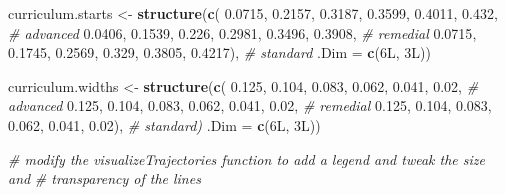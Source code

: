 \documentclass[english,floatsintext,jou]{apa6}
\newenvironment{Shaded}{\begin{snugshade}}{\end{snugshade}}
\newcommand{\KeywordTok}[1]{\textcolor[rgb]{0.13,0.29,0.53}{\textbf{{#1}}}}
\newcommand{\DataTypeTok}[1]{\textcolor[rgb]{0.13,0.29,0.53}{{#1}}}
\newcommand{\FloatTok}[1]{\textcolor[rgb]{0.00,0.00,0.81}{{#1}}}
\newcommand{\StringTok}[1]{\textcolor[rgb]{0.31,0.60,0.02}{{#1}}}
\newcommand{\CommentTok}[1]{\textcolor[rgb]{0.56,0.35,0.01}{\textit{{#1}}}}
\newcommand{\NormalTok}[1]{{#1}}
\theoremstyle{definition}
\theoremstyle{definition}
\theoremstyle{definition}
\theoremstyle{remark}
\begin{document}
\begin{appendix}
\begin{Shaded}
\begin{Highlighting}[]
\NormalTok{curriculum.starts <-}\StringTok{ }\KeywordTok{structure}\NormalTok{(}\KeywordTok{c}\NormalTok{(}
\FloatTok{0.0715}\NormalTok{, }\FloatTok{0.2157}\NormalTok{, }\FloatTok{0.3187}\NormalTok{, }\FloatTok{0.3599}\NormalTok{, }\FloatTok{0.4011}\NormalTok{, }\FloatTok{0.432}\NormalTok{, }\CommentTok{# advanced}
\FloatTok{0.0406}\NormalTok{, }\FloatTok{0.1539}\NormalTok{, }\FloatTok{0.226}\NormalTok{, }\FloatTok{0.2981}\NormalTok{, }\FloatTok{0.3496}\NormalTok{, }\FloatTok{0.3908}\NormalTok{, }\CommentTok{# remedial}
\FloatTok{0.0715}\NormalTok{, }\FloatTok{0.1745}\NormalTok{, }\FloatTok{0.2569}\NormalTok{, }\FloatTok{0.329}\NormalTok{, }\FloatTok{0.3805}\NormalTok{, }\FloatTok{0.4217}\NormalTok{), }\CommentTok{# standard}
\DataTypeTok{.Dim =} \KeywordTok{c}\NormalTok{(6L, 3L)) }

\NormalTok{curriculum.widths <-}\StringTok{ }\KeywordTok{structure}\NormalTok{(}\KeywordTok{c}\NormalTok{(}
\FloatTok{0.125}\NormalTok{, }\FloatTok{0.104}\NormalTok{, }\FloatTok{0.083}\NormalTok{, }\FloatTok{0.062}\NormalTok{, }\FloatTok{0.041}\NormalTok{, }\FloatTok{0.02}\NormalTok{, }\CommentTok{# advanced}
\FloatTok{0.125}\NormalTok{, }\FloatTok{0.104}\NormalTok{, }\FloatTok{0.083}\NormalTok{, }\FloatTok{0.062}\NormalTok{, }\FloatTok{0.041}\NormalTok{, }\FloatTok{0.02}\NormalTok{, }\CommentTok{# remedial}
\FloatTok{0.125}\NormalTok{, }\FloatTok{0.104}\NormalTok{, }\FloatTok{0.083}\NormalTok{, }\FloatTok{0.062}\NormalTok{, }\FloatTok{0.041}\NormalTok{, }\FloatTok{0.02}\NormalTok{), }\CommentTok{# standard)}
\DataTypeTok{.Dim =} \KeywordTok{c}\NormalTok{(6L, 3L))}

\CommentTok{# modify the visualizeTrajectories function to add a legend and tweak the size and }
\CommentTok{# transparency of the lines}


\end{Highlighting}
\end{Shaded}
\end{appendix}
\end{document}
